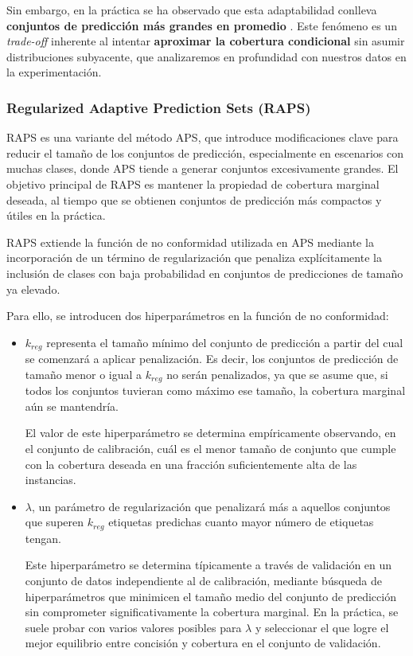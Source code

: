 Sin embargo, en la práctica se ha observado que esta adaptabilidad conlleva \textbf{conjuntos de predicción más grandes en promedio} \cite{romano2020, angelopoulos2020}. Este fenómeno es un \textit{trade-off} inherente al intentar \textbf{aproximar la cobertura condicional} sin asumir distribuciones subyacente, que analizaremos en profundidad con nuestros datos en la experimentación.


\subsubsection{Regularized Adaptive Prediction Sets (RAPS)}

RAPS \cite{angelopoulos2020} es una variante del método APS, que introduce modificaciones clave para reducir el tamaño de los conjuntos de predicción, especialmente en escenarios con muchas clases, donde APS tiende a generar conjuntos excesivamente grandes. El objetivo principal de RAPS es mantener la propiedad de cobertura marginal deseada, al tiempo que se obtienen conjuntos de predicción más compactos y útiles en la práctica. 

RAPS extiende la función de no conformidad utilizada en APS mediante la incorporación de un término de regularización que penaliza explícitamente la inclusión de clases con baja probabilidad en conjuntos de predicciones de tamaño ya elevado. 

Para ello, se introducen dos hiperparámetros en la función de no conformidad:

\begin{itemize}

    \item $k_{reg}$ representa el tamaño mínimo del conjunto de predicción a partir del cual se comenzará a aplicar penalización. Es decir, los conjuntos de predicción de tamaño menor o igual a $k_{reg}$ no serán penalizados, ya que se asume que, si todos los conjuntos tuvieran como máximo ese tamaño, la cobertura marginal aún se mantendría. 
    
    El valor de este hiperparámetro se determina empíricamente observando, en el conjunto de calibración, cuál es el menor tamaño de conjunto que cumple con la cobertura deseada en una fracción suficientemente alta de las instancias. 
   
    \item $\lambda$, un parámetro de regularización que penalizará más a aquellos conjuntos que superen $k_{reg}$ etiquetas predichas cuanto mayor número de etiquetas tengan. 

    Este hiperparámetro se determina típicamente a través de validación en un conjunto de datos independiente al de calibración, mediante búsqueda de hiperparámetros que minimicen el tamaño medio del conjunto de predicción sin comprometer significativamente la cobertura marginal. En la práctica, se suele probar con varios valores posibles para $\lambda$ y seleccionar el que logre el mejor equilibrio entre concisión y cobertura en el conjunto de validación.

\end{itemize}

